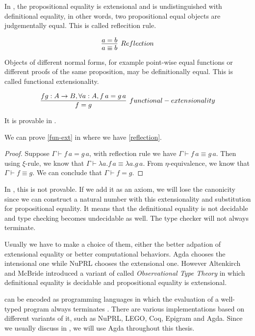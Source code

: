In \ett, the propositional equality is extensional and is undistinguished with definitional equality, in other words, two propositional equal objects are judgementally equal. This is called reflecition rule.

\begin{equation}
\label{reflection}
\infer[Reflection]{a \equiv b}{a = b}
\end{equation}

Objects of different normal forms, for example point-wise equal functions or different proofs of the same proposition, may be definitionally equal. This is called functional extensionality.

\begin{equation}
\label{fun-ext}
\infer[functional-extensionality]{f = g}{f g : A \rightarrow B, \forall a : A, f \, a = g \, a}
\end{equation}

It is provable in \ett.

\begin{lemma}
\label{functional extensionality is available in ett}
We can prove \ref{fun-ext} in \ett where we have \ref{reflection}.
\end{lemma}
 
\begin{proof}
Suppose $\Gamma \vdash f \,a = g \,a$, with reflection rule we have $\Gamma \vdash f \,a \equiv g \,a$.
Then using $\xi$-rule, we know that $\Gamma \vdash \lambda a . f \,a \equiv \lambda a . g \,a$.
From $\eta$-equivalence, we know that $\Gamma \vdash f \equiv g$. We can conclude that $\Gamma \vdash f = g$.
\end{proof}

In \itt, this is not provable. If we add it as an axiom, we will lose the canonicity since we can construct a natural number with this extensionality and substitution for propositional equality. It means that the definitional equality is not decidable and type checking becomes undecidable as well. The type checker will not always terminate.


Usually we have to make a choice of them, either the better adpation of extensional equality or better computational behaviors. Agda chooses the intensional one while NuPRL chooses the extensional one. However
Altenkirch and McBride introduced a variant of \ett called
\emph{Observational Type Theory}  \cite{alt:06} in which definitional equality is
decidable and propositional equality is extensional.


\mltt can be encoded as programming languages in
which the evaluation of a well-typed program always terminates \cite{nor:90}.
There are various implementations based on different variants of it, such as
NuPRL, LEGO, Coq, Epigram and Agda. Since we usually discuss in \itt, we will use Agda throughout this thesis.

